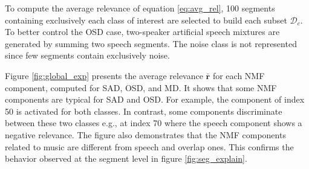 To compute the average relevance of equation \eqref{eq:avg_rel}, 100 segments containing exclusively each class of interest are selected to build each subset $\mathcal{D}_c$.
To better control the OSD case, two-speaker artificial speech mixtures are generated by summing two speech segments.
The noise class is not represented since few segments contain exclusively noise.

Figure \ref{fig:global_exp} presents the average relevance $\bar{\mathbf{r}}$ for each NMF component,  computed for SAD, OSD, and MD.
It shows that some NMF components are typical for SAD and OSD.
For example, the component of index 50 is activated for both classes.
In contrast, some components discriminate between these two classes e.g., at index 70 where the speech component shows a negative relevance.
The figure also demonstrates that the NMF components related to music are different from speech and overlap ones.
This confirms the behavior observed at the segment level in figure \ref{fig:seg_explain}.
